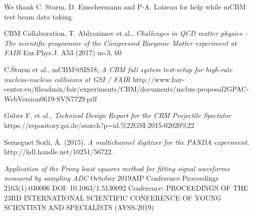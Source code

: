 \documentclass[a4paper,11pt]{article}
\begin{document}
\acknowledgments
We thank C. Sturm, D. Emschermann and P-A. Loizeau for help while mCBM test beam data taking.

\begin{thebibliography}{99}


CBM Collaboration, T. Ablyazimov et al., \emph{Challenges in QCD matter physics -The scientific programme of the Compressed Baryonic Matter experiment at FAIR} Eur.Phys.J. A53 (2017) no.3, 60 


C.Sturm et al., mCBM@SIS18, \emph{A CBM full system test-setup for high-rate nucleus-nucleus collisions at GSI / FAIR} http://www.fair-center.eu/fileadmin/fair/experiments/CBM/documents/mcbm-proposal2GPAC-WebVersion0619-SVN7729.pdf

Guber F, et al., \emph{Technical Design Report for the CBM Projectile Spectator} https://repository.gsi.de/search?p=id:\%22GSI-2015-02020\%22

Serneguet Sorli, Á. (2015). \emph{A multichannel digitizer for the PANDA experiment.} http://hdl.handle.net/10251/56722.

\emph{Application of the Prony least squares method for fitting signal waveforms measured by sampling ADC}
October 2019AIP Conference Proceedings 2163(1):030006
DOI: 10.1063/1.5130092
Conference: PROCEEDINGS OF THE 23RD INTERNATIONAL SCIENTIFIC CONFERENCE OF YOUNG SCIENTISTS AND SPECIALISTS (AYSS-2019)



\end{thebibliography}
\end{document}
